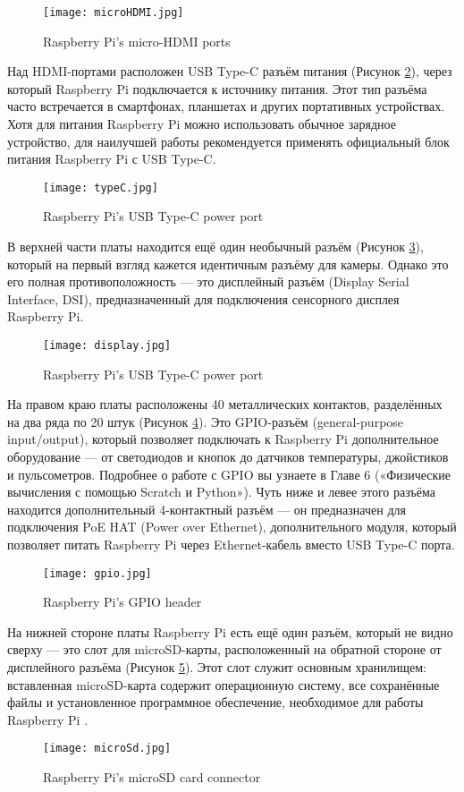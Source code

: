 \begin{figure}[H]
	\centering
	\texttt{[image: microHDMI.jpg]}
	\caption{Raspberry Pi’s micro-HDMI ports}
	\label{fig:microHDMI}
\end{figure}

Над HDMI-портами расположен USB Type-C разъём питания (Рисунок \ref{fig:typeC}), через который Raspberry Pi подключается к источнику питания. Этот тип разъёма часто встречается в смартфонах, планшетах и других портативных устройствах. Хотя для питания Raspberry Pi можно использовать обычное зарядное устройство, для наилучшей работы рекомендуется применять официальный блок питания Raspberry Pi с USB Type-C.

\begin{figure}[H]
	\centering
	\texttt{[image: typeC.jpg]}
	\caption{Raspberry Pi’s USB Type-C power port}
	\label{fig:typeC}
\end{figure}

В верхней части платы находится ещё один необычный разъём (Рисунок \ref{fig:display}), который на первый взгляд кажется идентичным разъёму для камеры. Однако это его полная противоположность — это дисплейный разъём (Display Serial Interface, DSI), предназначенный для подключения сенсорного дисплея Raspberry Pi.

\begin{figure}[H]
	\centering
	\texttt{[image: display.jpg]}
	\caption{Raspberry Pi’s USB Type-C power port}
	\label{fig:display}
\end{figure}

На правом краю платы расположены 40 металлических контактов, разделённых на два ряда по 20 штук (Рисунок \ref{fig:gpio}). Это GPIO-разъём (general-purpose input/output), который позволяет подключать к Raspberry Pi дополнительное оборудование — от светодиодов и кнопок до датчиков температуры, джойстиков и пульсометров. Подробнее о работе с GPIO вы узнаете в Главе 6 («Физические вычисления с помощью Scratch и Python»).
Чуть ниже и левее этого разъёма находится дополнительный 4-контактный разъём — он предназначен для подключения PoE HAT (Power over Ethernet), дополнительного модуля, который позволяет питать Raspberry Pi через Ethernet-кабель вместо USB Type-C порта.

\begin{figure}[H]
	\centering
	\texttt{[image: gpio.jpg]}
	\caption{Raspberry Pi’s GPIO header}
	\label{fig:gpio}
\end{figure}

На нижней стороне платы Raspberry Pi есть ещё один разъём, который не видно сверху — это слот для microSD-карты, расположенный на обратной стороне от дисплейного разъёма (Рисунок \ref{fig:microSd}). Этот слот служит основным хранилищем: вставленная microSD-карта содержит операционную систему, все сохранённые файлы и установленное программное обеспечение, необходимое для работы Raspberry Pi \cite{RaspberryPi}.

\begin{figure}[H]
	\centering
	\texttt{[image: microSd.jpg]}
	\caption{Raspberry Pi’s microSD card connector}
	\label{fig:microSd}
\end{figure}
\newpage
